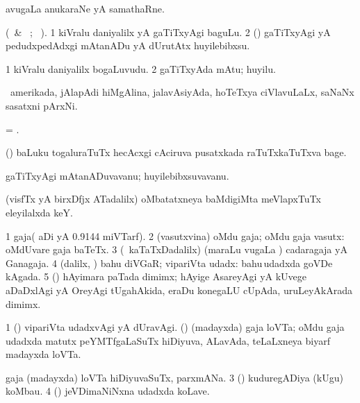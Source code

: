  avugaLa anukaraNe yA samathaRne.
\eanum
\emng
\eentry

\bentry
{} 
\gl{\akirx} 
\bmng
(\BU\ \& \BUkaq\ ; \vakaq\ ). 
\bnum
\num{1} kiVralu daniyalilx yA gaTiTxyAgi baguLu. 
\num{2} (\AmA) gaTiTxyAgi yA pedudxpedAdxgi mAtanADu yA dUrutAtx huyilebibxsu.
\enum
\emng
\eentry

\bentry
{} 
\gl{\nA}
\bmng
\bnum
\num{1} kiVralu daniyalilx bogaLuvudu. 
\num{2} gaTiTxyAda mAtu; huyilu.
\enum
\emng
\eentry

\bentry
{} 
\gl{\nA} 
\bmng
\da\ amerikada, jAlapAdi hiMgAlina, jalavAsiyAda, hoTeTxya ciVlavuLaLx, saNaNx sasatxni pArxNi.
\emng
\eentry

\bentry 
{} 
\gl{\nA}
\bmng
= .
\emng 
\eentry

\bentry
{} 
\gl{\nA} 
\bmng
(\birx) baLuku togaluraTuTx hecAcxgi cAciruva pusatxkada raTuTxkaTuTxva bage.
\emng
\eentry

\bentry
{} 
\gl{\nA} 
\bmng
gaTiTxyAgi mAtanADuvavanu; huyilebibxsuvavanu.
\emng
\eentry

\bentry
{} 
\gl{\nA} 
\bmng
(visfTx  yA birxDfjx ATadalilx) oMbatatxneya baMdigiMta meVlapxTuTx eleyilalxda keY.
\emng
\eentry

\bentry
{} 
\gl{\nA} 
\bmng
\bnum
\num{1} gaja( aDi yA 0.9144 miVTarf).
\num{2} (vasutxvina) oMdu gaja; oMdu gaja vasutx:  oMdUvare gaja baTeTx. 
\num{3} (\kanmu\ kaTaTxDadalilx) (maraLu \mo vugaLa \vi) cadaragaja yA Ganagaja.
\num{4} (\bava dalilx, \AmA) bahu diVGaR; vipariVta udadx:   bahu\,udadxda goVDe kAgada. 
\num{5} (\nw) hAyimara paTada dimimx; hAyige AsareyAgi yA kUvege aDaDxlAgi yA OreyAgi tUgahAkida, eraDu konegaLU cUpAda, uruLeyAkArada dimimx.
\enum
\emng

\noindent
\gl{\pagu}
\bmng
\bnum
\num{1}  (\rUpa) vipariVta udadxvAgi yA dUravAgi. 
  (\birx) 
\banum
{}  (madayxda) gaja loVTa; oMdu gaja udadxda matutx  peYMTfgaLaSuTx hiDiyuva, ALavAda, teLaLxneya biyarf madayxda loVTa.

 gaja (madayxda) loVTa hiDiyuvaSuTx, parxmANa. 
\eanum
\numie
\num{3}  (\birx) kuduregADiya (kUgu) koMbau. 
\num{4}  (\birx) jeVDimaNiNxna udadxda koLave.
\enum
\emng
\eentry

